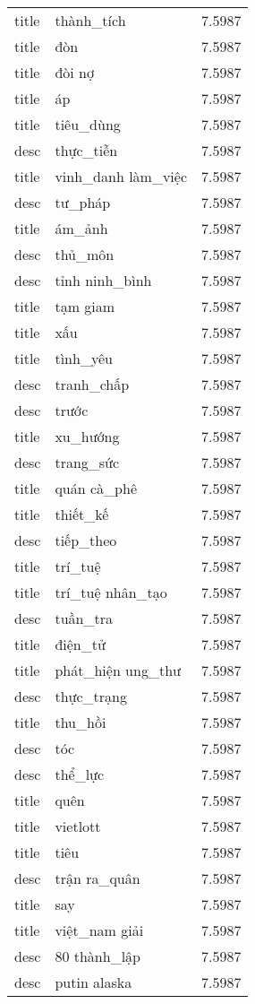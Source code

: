 \documentclass{article}
\begin{document}
\begin{tabular}{lll}
title & thành\_tích & 7.5987\\
title & đòn & 7.5987\\
title & đòi nợ & 7.5987\\
title & áp & 7.5987\\
title & tiêu\_dùng & 7.5987\\
desc & thực\_tiễn & 7.5987\\
title & vinh\_danh làm\_việc & 7.5987\\
desc & tư\_pháp & 7.5987\\
title & ám\_ảnh & 7.5987\\
desc & thủ\_môn & 7.5987\\
desc & tỉnh ninh\_bình & 7.5987\\
title & tạm giam & 7.5987\\
title & xấu & 7.5987\\
title & tình\_yêu & 7.5987\\
desc & tranh\_chấp & 7.5987\\
desc & trước & 7.5987\\
title & xu\_hướng & 7.5987\\
desc & trang\_sức & 7.5987\\
title & quán cà\_phê & 7.5987\\
title & thiết\_kế & 7.5987\\
desc & tiếp\_theo & 7.5987\\
title & trí\_tuệ & 7.5987\\
title & trí\_tuệ nhân\_tạo & 7.5987\\
desc & tuần\_tra & 7.5987\\
title & điện\_tử & 7.5987\\
title & phát\_hiện ung\_thư & 7.5987\\
desc & thực\_trạng & 7.5987\\
title & thu\_hồi & 7.5987\\
desc & tóc & 7.5987\\
desc & thể\_lực & 7.5987\\
title & quên & 7.5987\\
title & vietlott & 7.5987\\
title & tiêu & 7.5987\\
desc & trận ra\_quân & 7.5987\\
title & say & 7.5987\\
title & việt\_nam giải & 7.5987\\
desc & 80 thành\_lập & 7.5987\\
desc & putin alaska & 7.5987\\

\end{tabular}
\end{document}
